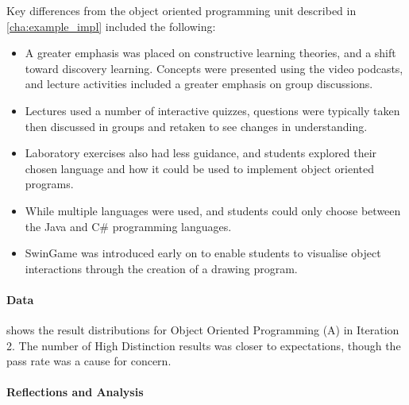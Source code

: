 Key differences from the object oriented programming unit described in \cref{cha:example_impl} included the following:
\begin{itemize}[noitemsep,nolistsep]
	\item A greater emphasis was placed on constructive learning theories, and a shift toward discovery learning. Concepts were presented using the video podcasts, and lecture activities included a greater emphasis on group discussions.
	\item Lectures used a number of interactive quizzes, questions were typically taken then discussed in groups and retaken to see changes in understanding.
	\item Laboratory exercises also had less guidance, and students explored their chosen language and how it could be used to implement object oriented programs.
	\item While multiple languages were used, and students could only choose between the Java and C\# programming languages.
	\item SwinGame was introduced early on to enable students to visualise object interactions through the creation of a drawing program.
\end{itemize}


\paragraph{Data} %
\label{ssub:data2}

 shows the result distributions for Object Oriented Programming (A) in Iteration 2. The number of High Distinction results was closer to expectations, though the pass rate was a cause for concern. 

\paragraph{Reflections and Analysis} %
\label{ssub:staff_reflections_and_analysis2}

